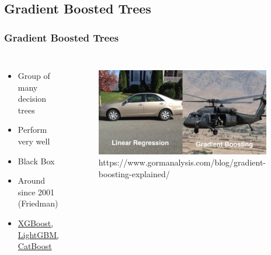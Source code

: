 \documentclass[
    utf8,
    aspectratio=169
]{beamer}  %
\begin{document}
\subsection{Gradient Boosted Trees}

\begin{frame}
	\frametitle{Gradient Boosted Trees}
	\begin{columns}[onlytextwidth]
		\begin{itemize}
			\item Group of many decision trees
			\item Perform very well
			\item Black Box
			\item Around since 2001 (Friedman)
			\item \href{https://github.com/mayer79/gradient_boosting_comparison}{XGBoost, LightGBM, CatBoost}
		\end{itemize}
		
		\begin{figure}
			\includegraphics[width=0.95\textwidth]{pics/helicopter.jpg}
			\tiny{https://www.gormanalysis.com/blog/gradient-boosting-explained/}
		\end{figure}
	\end{columns}
\end{frame}
\end{document}
